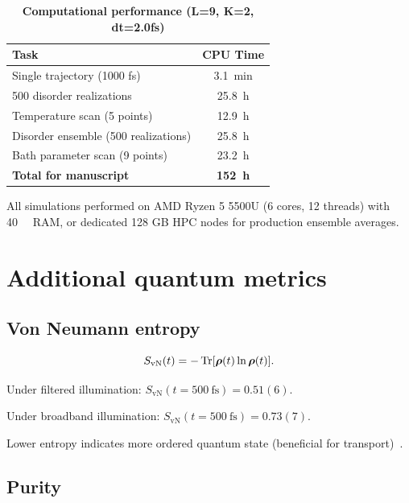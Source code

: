 \documentclass[11pt,a4paper]{article}
\begin{document}
\begin{table}[h]
\centering
\caption{\textbf{Computational performance (L=9, K=2, dt=2.0fs)}}
\label{tab:SI_performance}
\begin{tabular}{lc}
\toprule
\textbf{Task} & \textbf{CPU Time} \\
\midrule
Single trajectory (1000 fs) & \SI{3.1}{\minute} \\
500 disorder realizations & \SI{25.8}{\hour} \\
Temperature scan (5 points) & \SI{12.9}{\hour} \\
Disorder ensemble (500 realizations) & \SI{25.8}{\hour} \\
Bath parameter scan (9 points) & \SI{23.2}{\hour} \\
\midrule
\textbf{Total for manuscript} & \textbf{\SI{152}{\hour}} \\
\bottomrule
\end{tabular}
\end{table}

All simulations performed on AMD Ryzen 5 5500U (6 cores, 12 threads) with \SI{40}{\giga\byte} RAM, or dedicated 128 GB HPC nodes for production ensemble averages.


\section{Additional quantum metrics}

\subsection{Von Neumann entropy}

\begin{equation}
S_{\mathrm{vN}}(t) = -\Tr[\vb*{\rho}(t)\ln\vb*{\rho}(t)].
\label{eq:SI_von_neumann}
\end{equation}

Under filtered illumination: $S_{\mathrm{vN}}(t=\SI{500}{\femto\second}) = 0.51(6)$.

Under broadband illumination: $S_{\mathrm{vN}}(t=\SI{500}{\femto\second}) = 0.73(7)$.

Lower entropy indicates more ordered quantum state (beneficial for transport)~\cite{Cao2020}.

\subsection{Purity}
\end{document}
